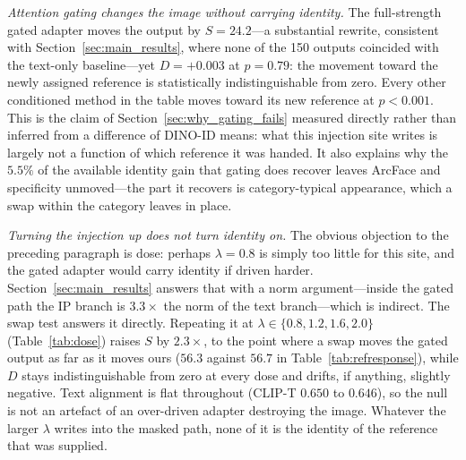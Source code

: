 \documentclass[10pt,twocolumn,letterpaper]{article}
\begin{document}
\noindent\textit{Attention gating changes the image without carrying
identity.}
The full-strength gated adapter moves the output by $S{=}24.2$---a substantial
rewrite, consistent with Section~\ref{sec:main_results}, where none of the 150
outputs coincided with the text-only baseline---yet $D=+0.003$ at $p=0.79$:
the movement toward the newly assigned reference is statistically
indistinguishable from zero.  Every other conditioned method in the table
moves toward its new reference at $p<0.001$.  This is the claim of
Section~\ref{sec:why_gating_fails} measured directly rather than inferred from
a difference of DINO-ID means: what this injection site writes is largely not
a function of which reference it was handed.  It also explains why the
$5.5\%$ of the available identity gain that gating does recover leaves ArcFace
and specificity unmoved---the part it recovers is category-typical appearance,
which a swap within the category leaves in place.

\noindent\textit{Turning the injection up does not turn identity on.}
The obvious objection to the preceding paragraph is dose: perhaps
$\lambda{=}0.8$ is simply too little for this site, and the gated adapter
would carry identity if driven harder.  Section~\ref{sec:main_results}
answers that with a norm argument---inside the gated path the IP branch is
$3.3\times$ the norm of the text branch---which is indirect.  The swap test
answers it directly.  Repeating it at
$\lambda\in\{0.8,1.2,1.6,2.0\}$ (Table~\ref{tab:dose}) raises $S$ by
$2.3\times$, to the point where a swap moves the gated output as far as it
moves ours ($56.3$ against $56.7$ in Table~\ref{tab:refresponse}), while $D$
stays indistinguishable from zero at every dose and drifts, if anything,
slightly negative.  Text alignment is flat throughout (CLIP-T $0.650$ to
$0.646$), so the null is not an artefact of an over-driven adapter destroying
the image.  Whatever the larger $\lambda$ writes into the masked path, none of
it is the identity of the reference that was supplied.

\begin{table}[htbp]
\centering
\caption{%
  \textbf{Dose response of the gated path} (30 samples per $\lambda$, the
  reference-swap protocol of Table~\ref{tab:refresponse} repeated at four
  injection scales; $\lambda{=}0.8$ is the row reported there and matches our
  own method's scale).  Driving the injection to $2.5\times$ our scale makes
  the output move $2.3\times$ further under a reference swap without moving
  the identity response off zero, at unchanged text alignment.%
}
\label{tab:dose}
\end{table}
\end{document}
